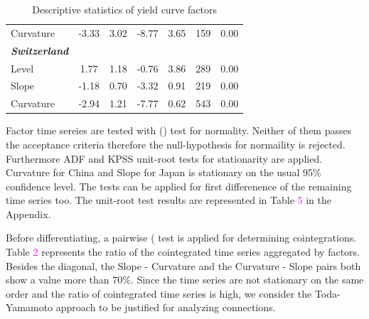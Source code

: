 \documentclass[12pt,bibliography=totoc]{article}
\begin{document}
\begin{table}[H]
\begin{tabular}{l c c c c c c}
Curvature					&	-3.33	&	3.02	&	-8.77	&	3.65	&	159	&	0.00	\\
\textit{\textbf{Switzerland}}				&		&		&		&		&		&		\\
Level						&	1.77	&	1.18	&	-0.76	&	3.86	&	289	&	0.00	\\
Slope				&	-1.18	&	0.70	&	-3.32	&	0.91	&	219	&	0.00	\\
Curvature					&	-2.94	&	1.21	&	-7.77	&	0.62	&	543	&	0.00	\\

\hline%
\end{tabular}
\label{table:nonlin}%

\caption{Descriptive statistics of yield curve factors}%
\end{table}


\bigskip


Factor time sereies are tested with (\cite{bera1981efficient}) test for normality. Neither of them passes the acceptance criteria therefore the null-hypothesis for normaility is rejected. Furthermore ADF and KPSS unit-root tests for stationarity are applied. Curvature for China and Slope for Japan is stationary on the usual 95\% confidence level. The tests can be applied for first differenence of the remaining time series too. The unit-root test results are represented in Table \textcolor{magenta}{5} in the Appendix.

Before differentiating, a pairwise  (\cite{engle1987co} test is applied for determining cointegrations. Table \textcolor{magenta}{2} represents the ratio of the cointegrated time series aggregated by factors. Besides the diagonal, the Slope - Curvature and the Curvature - Slope pairs both show a value more than 70\%. Since the time series are not stationary on the same order and the ratio of cointegrated time series is high, we consider the Toda-Yamamoto approach to be justified for analyzing connections.
\end{document}
